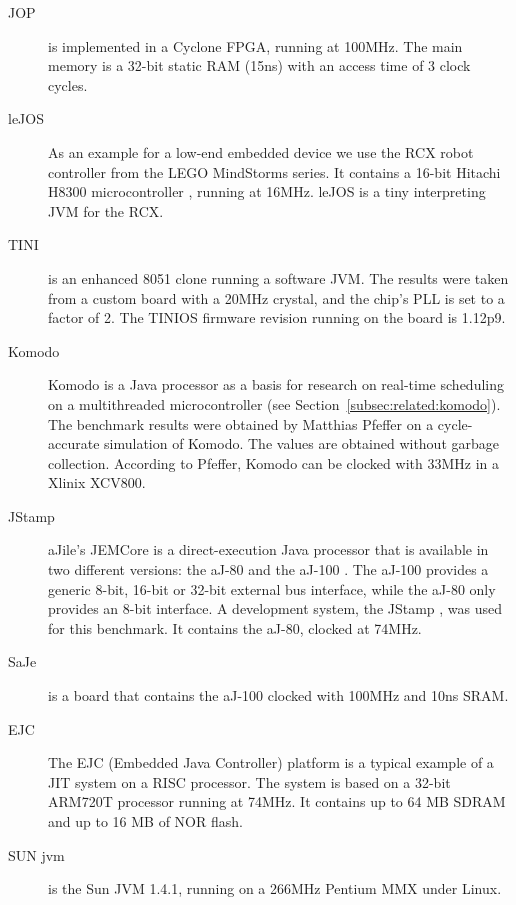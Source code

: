 \begin{description}
    \item[JOP]
is implemented in a Cyclone FPGA, running at 100MHz. The main memory
is a 32-bit static RAM (15ns) with an access time of 3 clock cycles.

    \item[leJOS]
As an example for a low-end embedded device we use the RCX robot
controller from the LEGO MindStorms series. It contains a 16-bit
Hitachi H8300 microcontroller \cite{hitachi:h8}, running at 16MHz.
leJOS \cite{lejos} is a tiny interpreting JVM for the RCX.

    \item[TINI]
is an enhanced 8051 clone running a software JVM. The results were
taken from a custom board with a 20MHz crystal, and the chip's PLL
is set to a factor of 2. The TINIOS firmware revision running on the
board is 1.12p9.

    \item[Komodo]
Komodo \cite{komodo2003} is a Java processor as a basis for research
on real-time scheduling on a multithreaded microcontroller (see
Section~\ref{subsec:related:komodo}). The benchmark results were
obtained by Matthias Pfeffer \cite{Pfeffer} on a cycle-accurate
simulation of Komodo. The values are obtained without garbage
collection. According to Pfeffer, Komodo can be clocked with 33MHz
in a Xlinix XCV800.

    \item[JStamp]
aJile's JEMCore is a direct-execution Java processor that is
available in two different versions: the aJ-80 and the aJ-100
\cite{aJile}. The aJ-100 provides a generic 8-bit, 16-bit or 32-bit
external bus interface, while the aJ-80 only provides an 8-bit
interface. A development system, the JStamp \cite{JStamp}, was used
for this benchmark. It contains the aJ-80, clocked at 74MHz.

    \item[SaJe] is a board that contains the aJ-100 clocked with
    100MHz and 10ns SRAM.

    \item[EJC]
The EJC (Embedded Java Controller) platform \cite{EJC} is a typical
example of a JIT system on a RISC processor. The system is based on
a 32-bit ARM720T processor running at 74MHz. It contains up to 64 MB
SDRAM and up to 16 MB of NOR flash.

    \item[SUN jvm]
is the Sun JVM 1.4.1, running on a 266MHz Pentium MMX under Linux.


\end{description}
